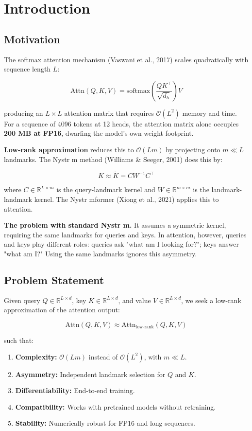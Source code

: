 
\section{Introduction}

\subsection{Motivation}

The softmax attention mechanism (Vaswani et al., 2017) scales quadratically 
with sequence length $L$:

\[
\text{Attn}(Q, K, V) = \text{softmax}\!\left(\frac{Q K^\top}{\sqrt{d_h}}\right) V
\]

producing an $L \times L$ attention matrix that requires $\mathcal{O}(L^2)$ 
memory and time. For a sequence of 4096 tokens at 12 heads, the attention 
matrix alone occupies \textbf{200 MB at FP16}, dwarfing the model's own weight 
footprint.

\textbf{Low-rank approximation} reduces this to $\mathcal{O}(L m)$ by projecting 
onto $m \ll L$ landmarks. The Nystr m method (Williams \& Seeger, 2001) does 
this by:

\[
K \approx \tilde{K} = C W^{-1} C^\top
\]

where $C \in \mathbb{R}^{L \times m}$ is the query-landmark kernel and 
$W \in \mathbb{R}^{m \times m}$ is the landmark-landmark kernel. The 
Nystr mformer (Xiong et al., 2021) applies this to attention.

\textbf{The problem with standard Nystr m.} It assumes a symmetric kernel, 
requiring the same landmarks for queries and keys. In attention, however, 
queries and keys play different roles: queries ask "what am I looking for?"; 
keys answer "what am I?" Using the same landmarks ignores this asymmetry.

\subsection{Problem Statement}

Given query $Q \in \mathbb{R}^{L \times d}$, key $K \in \mathbb{R}^{L \times d}$, 
and value $V \in \mathbb{R}^{L \times d}$, we seek a low-rank approximation 
of the attention output:

\[
\text{Attn}(Q, K, V) \approx \text{Attn}_\text{low-rank}(Q, K, V)
\]

such that:

\begin{enumerate}
\item \textbf{Complexity:} $\mathcal{O}(L m)$ instead of $\mathcal{O}(L^2)$, with $m \ll L$.
\item \textbf{Asymmetry:} Independent landmark selection for $Q$ and $K$.
\item \textbf{Differentiability:} End-to-end training.
\item \textbf{Compatibility:} Works with pretrained models without retraining.
\item \textbf{Stability:} Numerically robust for FP16 and long sequences.

\end{enumerate}
